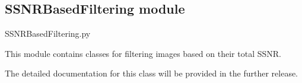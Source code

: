 \documentclass[letterpaper,10pt,english]{sphinxmanual}
\begin{document}
\begin{fulllineitems}
\begin{fulllineitems}
\label{\detokenize{source/SIMulator:SIMulator.SIMulator.reconstruct_real_space}}
\pysigstartsignatures
\pysiglinewithargsret
{}
{\sphinxparamcomma {}}
{}
\pysigstopsignatures
\end{fulllineitems}


\end{fulllineitems}


\sphinxstepscope


\subsection{SSNRBasedFiltering module}
\label{\detokenize{source/SSNRBasedFiltering:module-SSNRBasedFiltering}}\label{\detokenize{source/SSNRBasedFiltering:ssnrbasedfiltering-module}}\label{\detokenize{source/SSNRBasedFiltering::doc}}
\sphinxAtStartPar
SSNRBasedFiltering.py

\sphinxAtStartPar
This module contains classes for filtering images based on their total SSNR.

\sphinxAtStartPar
The detailed documentation for this class will be provided in the further release.

\end{document}

